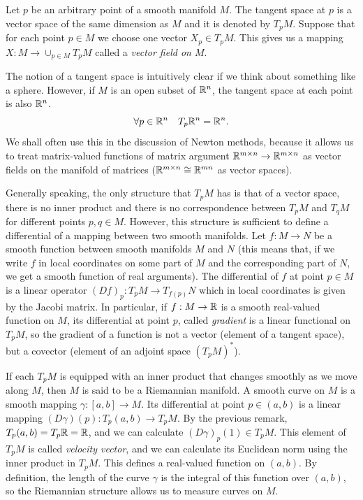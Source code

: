 Let $p$ be an arbitrary point of a smooth manifold $M$. The tangent space at $p$
is a vector space of the same dimension as $M$ and it is denoted by $T_pM$.
Suppose that for each point $p \in M$ we choose one vector $X_p \in T_pM$. 
This gives us a mapping $X: M \to \cup_{p \in M} T_pM$ called a
\textit{vector field on $M$}.


The notion of a tangent space is intuitively clear if we think about something like a sphere.
However, if $M$ is an open subset of $\mathbb{R}^n$, the tangent space at each point
is also $\mathbb{R}^n$.
\begin{equation}
    \forall p \in \mathbb{R}^n \quad T_p\mathbb{R}^n = \mathbb{R}^n.
\end{equation}
We shall often use this in the discussion of Newton methods, because
it allows us to treat matrix-valued functions of matrix argument $\mathbb{R}^{m \times n} \to \mathbb{R}^{m \times n}$
as vector fields on the manifold of matrices ($\mathbb{R}^{m \times n} \cong \mathbb{R}^{mn}$ as vector spaces).


Generally speaking, the only structure that $T_pM$ has is that of a vector space, there is no
inner product and there is no correspondence between $T_pM$ and $T_qM$ for different
points $p, q \in M$. However, this structure is sufficient to define a differential
of a mapping between two smooth manifolds. Let $f : M \to N$ be a smooth
function between smooth manifolds $M$ and $N$ (this means that, if we write
$f$ in local coordinates on some part of $M$ and the corresponding part of $N$,
we get a smooth function of real arguments). The differential of $f$
at point $p \in M$ is a linear operator $(Df)_p : T_pM \to T_{f(p)}N$ which in
local coordinates is given by the Jacobi matrix. In particular,
if $f : M \to \mathbb{R}$ is a smooth real-valued function on $M$, its differential at point $p$,
called \textit{gradient} is a linear functional on $T_pM$,
so the gradient of a function is not a vector (element of a tangent space),
but a covector (element of an adjoint space $(T_pM)^*$).



If each $T_pM$ is equipped with an inner product
that changes smoothly as we move along $M$, then $M$ is said to be a Riemannian manifold.
A smooth curve on $M$ is a smooth mapping $\gamma : [a, b] \rightarrow M$.
Its differential at point $p \in (a, b)$ is a linear mapping $(D\gamma)(p) : T_p(a,b) \to T_pM$.
By the previous remark, $T_p(a, b) = T_p \mathbb{R} = \mathbb{R}$, and we can calculate $(D\gamma)_p(1) \in T_pM$.
This element of $T_pM$ is called \textit{velocity vector}, and we can calculate
its Euclidean norm using the inner product in $T_pM$. This defines a real-valued function
on $(a, b)$. By definition, the length of the curve $\gamma$ is the integral
of this function over $(a,b)$, so the Riemannian structure allows us to measure curves on $M$.


